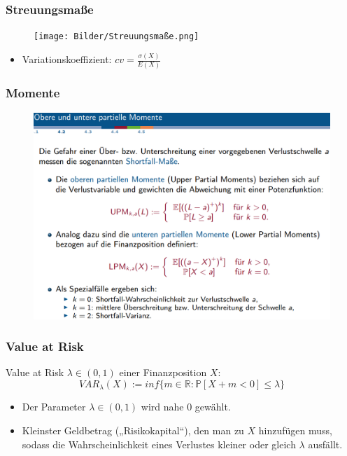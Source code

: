 \documentclass[12pt]{report}
\theoremstyle{dotless}
\theoremstyle{definition}
\begin{document}
\subsubsection{Streuungsmaße}
\begin{figure}[ht]
	\centering
	\texttt{[image: Bilder/Streuungsmaße.png]}
\end{figure}

\begin{itemize}
\item Variationskoeffizient: $cv=\frac{\sigma(X)}{E(X)}$
\end{itemize}

\subsubsection{Momente}

\begin{figure}[ht]
	\centering
	\includegraphics[width=0.9 \textwidth]{Bilder/Momente.png}
\end{figure}



\subsubsection{Value at Risk}
Value at Risk $\lambda \in (0,1)$ einer Finanzposition $X$:
\begin{equation}
VAR_\lambda(X) := inf\{m \in \mathbb{R}: \mathbb{P}[X+m<0]\leq \lambda\}
\end{equation}
\begin{itemize}
\item Der Parameter $\lambda \in (0,1)$ wird nahe 0 gewählt.
\item Kleinster Geldbetrag („Risikokapital“), den man zu $X$ hinzufügen muss,
sodass die Wahrscheinlichkeit eines Verlustes kleiner oder gleich $\lambda$ ausfällt.
\end{itemize}
\end{document}
